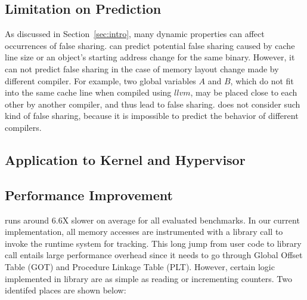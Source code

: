 \label{sec:discussion}

\subsection{Limitation on Prediction}
As discussed in Section~\ref{sec:intro}, many dynamic properties
can affect occurrences of false sharing. 
\Predator{} can predict potential false sharing caused by cache line size 
or an object's starting address change for the same binary.
However, it can not predict false sharing in the case of  
memory layout change made by different compiler. 
For example,  two global variables $A$ and $B$, which do not fit into 
the same cache line when compiled using $llvm$, may be placed close to each
other by another compiler, and thus lead to false sharing. 
\Predator {} does not consider such kind of false sharing, because
it is impossible to predict the behavior of different compilers.

\subsection{Application to Kernel and Hypervisor}
\begin{comment}
Although \Predator{} conceptually can be used to detect false sharing in different levels of 
software stack, currently it can not be applied to those levels directly. 
Some components, like customized memory manager, can only work in user level. Also, \Predator{}
has to identify the source of accesses using some system specfic calls. For example, it uses
gettid() to identify accesses from different threads.   
Extending \Predator{} to different levels of software stack will be the future work for us.
\end{comment}

\subsection{Performance Improvement}
\Predator{} runs around $6.6$X slower on average for all evaluated benchmarks. 
In our current implementation, all memory accesses are instrumented with a library call to 
invoke the runtime system for tracking. 
This long jump from user code to library call entails large performance overhead
since it needs to go through Global Offset Table (GOT) and Procedure Linkage Table (PLT).
However, certain logic implemented in library are as simple as reading or
incrementing counters. Two identifed places are shown below:

